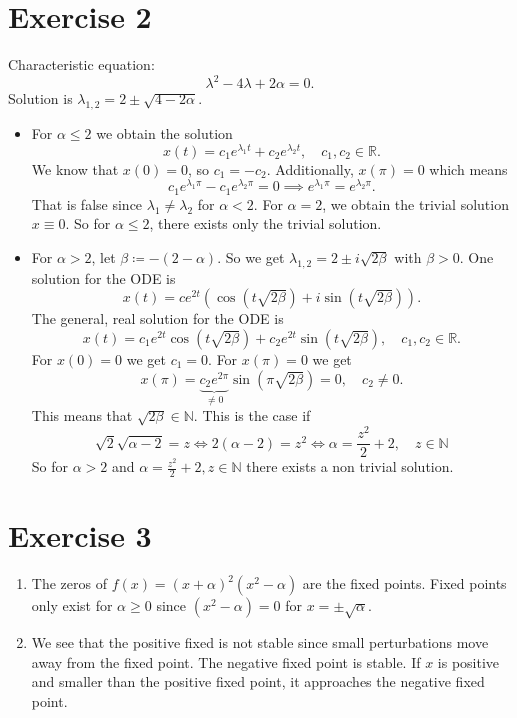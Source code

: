 \documentclass{article}
\theoremstyle{named}
\begin{document}
\section*{Exercise 2}
Characteristic equation:
\[
	\lambda^2-4\lambda + 2\alpha = 0.
\]
Solution is $\lambda_{1,2} = 2 \pm \sqrt{4-2\alpha}$. 
\begin{itemize}
	\item For $\alpha \leq 2$ we obtain the solution
	\[
	x(t) = c_1 e^{\lambda_1 t} + c_2 e^{\lambda_2 t}, \quad c_1,c_2 \in \mathbb R.
	\]
	We know that $x(0) = 0$, so $c_1 = -c_2$. Additionally, $x(\pi) = 0$ which means
	\[
	c_1 e^{\lambda_1 \pi} - c_1 e^{\lambda_2 \pi} = 0 \implies e^{\lambda_1 \pi} = e^{\lambda_2 \pi}.
	\]
	That is false since $\lambda_1 \neq \lambda_2$ for $\alpha < 2$. For $\alpha = 2$, we obtain the trivial solution $x\equiv0$. So for $\alpha \leq 2$, there exists only the trivial solution.
	
	\item For $\alpha > 2$, let $\beta \coloneqq -(2-\alpha)$. So we get $\lambda_{1,2} = 2 \pm i\sqrt{2\beta}$ with $\beta > 0$. One solution for the ODE is 
	\[
		x(t) = ce^{2t}(\cos(t\sqrt{2\beta}) + i \sin(t \sqrt{2\beta})).
	\]
	The general, real solution for the ODE is
	\[
		x(t) = c_1 e^{2t}\cos(t\sqrt{2\beta}) + c_2 e^{2t}\sin(t\sqrt{2\beta}), \quad c_1, c_2 \in \mathbb R.
	\]
	For $x(0) = 0$ we get $c_1 = 0$. For $x(\pi) =0$ we get
	\[
		x(\pi) = \underbrace{c_2e^{2\pi}}_{\neq 0}\sin(\pi \sqrt{2\beta}) = 0, \quad c_2 \neq 0.
	\]
	This means that $\sqrt{2\beta} \in \mathbb N$. This is the case if
	\[
		\sqrt2 \sqrt{\alpha -2} = z \iff 2(\alpha-2) = z^2 \iff \alpha = \frac{z^2}{2}+2, \quad z \in \mathbb N
	\]
	So for $\alpha > 2$ and $\alpha = \frac{z^2}{2}+2, z \in \mathbb N$ there exists a non trivial solution.
\end{itemize}

\section*{Exercise 3}
\begin{enumerate}[label=(\roman *)]
	\item The zeros of $f(x) = (x+\alpha)^2(x^2-\alpha)$ are the fixed points. Fixed points only exist for $\alpha \geq 0$ since $(x^2-\alpha) = 0$ for $x = \pm \sqrt{\alpha}$.
	
	\item We see that the positive fixed is not stable since small perturbations move away from the fixed point. The negative fixed point is stable. If $x$ is positive and smaller than the positive fixed point, it approaches the negative fixed point.
	\begin{center}
	\end{center}
\end{enumerate}
\end{document}
